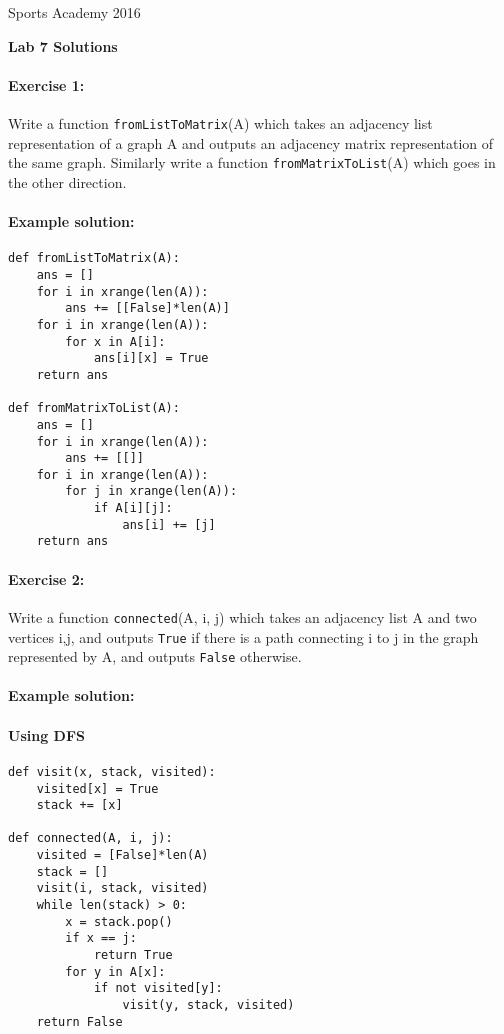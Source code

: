 \documentclass[11pt]{article}
\newlength{\toppush}
\newcommand{\htitle}[2]{\noindent\vspace*{-\toppush}\newline\parbox{6.5in}
 {\large Sports Academy \hfill #1\newline
\hspace*{\fill}{\bf Algorithms and Programming for High Schoolers} \hspace*{\fill} \newline
\mbox{}\hrulefill\mbox{}}\vspace*{1ex}\mbox{}\newline
\begin{center}{\Large\bf #2}\end{center}}
\begin{document}
\htitle{2016}{Lab 7 Solutions}

\paragraph{Exercise 1:}
Write a function \texttt{fromListToMatrix}(A) which takes an adjacency
list representation of a graph A and outputs an adjacency matrix
representation of the same graph.  Similarly write a function
\texttt{fromMatrixToList}(A) which goes in the other direction.

\paragraph{Example solution:}
\begin{verbatim}
def fromListToMatrix(A):
    ans = []
    for i in xrange(len(A)):
        ans += [[False]*len(A)]
    for i in xrange(len(A)):
        for x in A[i]:
            ans[i][x] = True
    return ans

def fromMatrixToList(A):
    ans = []
    for i in xrange(len(A)):
        ans += [[]]
    for i in xrange(len(A)):
        for j in xrange(len(A)):
            if A[i][j]:
                ans[i] += [j]
    return ans
\end{verbatim}

\paragraph{Exercise 2:}
Write a function \texttt{connected}(A, i, j) which takes an adjacency
list A and two vertices i,j, and outputs \texttt{True} if there is a
path connecting i to j in the graph represented by A, and outputs
\texttt{False} otherwise.

\paragraph{Example solution:}
\paragraph{Using DFS}

\begin{verbatim}
def visit(x, stack, visited):
    visited[x] = True
    stack += [x]

def connected(A, i, j):
    visited = [False]*len(A)
    stack = []
    visit(i, stack, visited)
    while len(stack) > 0:
        x = stack.pop()
        if x == j:
            return True
        for y in A[x]:
            if not visited[y]:
                visit(y, stack, visited)
    return False
\end{verbatim}
\end{document}
